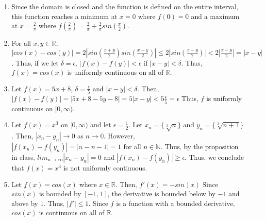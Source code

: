 \documentclass{article}
\newcommand{\nn}{\mathbb N}
\newcommand{\rr}{\mathbb R}
\begin{document}
\begin{enumerate}
    \item Since the domain is closed and the function is defined on the entire interval, 
    this function reaches a minimum at $x = 0$ where $f(0) = 0$ and a maximum 
    at $x = \frac{2}{\pi}$ where $f(\frac{2}{\pi}) = \frac{2}{\pi} + \frac{2}{\pi}
    sin(\frac{\pi}{2})$. 

    \item For all $x, y \in \rr$, $|cos(x) - cos(y)| = 2|sin(\frac{x+y}{2})
    sin(\frac{x-y}{2})| \leq 2|sin(\frac{x-y}{2})| < 2|\frac{x-y}{2}| = |x-y|$. Thus, 
    if we let $\delta = \epsilon$, $|f(x) - f(y)| < \epsilon$ if $|x-y| < \delta$. Thus, 
    $f(x) = cos(x)$ is uniformly continuous on all of $\rr$. 

    \item Let $f(x) = 5x+8$, $\delta = \frac{\epsilon}{5}$ and $|x - y| < \delta$. 
    Then, $|f(x) - f(y)| = |5x+8 - 5y-8| = 5|x - y| < 5\frac{\epsilon}{5} = \epsilon$
    Thus, $f$ is uniformly continuous on $[0, \infty)$. 

    \item Let $f(x) = x^3$ on $[0, \infty)$ and let $\epsilon = \frac{1}{2}$.
    Let $x_n = \{\sqrt[3]{n}\}$ and $y_n = \{\sqrt[3]{n+1}\}$. Then, $|x_n - y_n| 
    \rightarrow 0$ as $n \rightarrow 0$. However, $|f(x_n) - f(y_n)| = |n - n - 1| = 1$
    for all $n\in \nn$. Thus, by the proposition in class, $lim_{n\rightarrow \infty} 
    |x_n - y_n| = 0$ and $|f(x_n) - f(y_n)| \geq \epsilon$. Thus, we conclude that 
    $f(x) = x^3$ is not uniformly continuous. 

    \item Let $f(x) = cos(x)$ where $x\in \rr$. Then, $f'(x) = -sin(x)$ Since $sin(x)$
    is bounded by $[-1, 1]$, the derivative is bounded below by $-1$ and above by $1$. 
    Thus, $|f'| \leq 1$. Since $f$ is a function with a bounded derivative, $cos(x)$
    is continuous on all of $\rr$. 


\end{enumerate}
\end{document}
